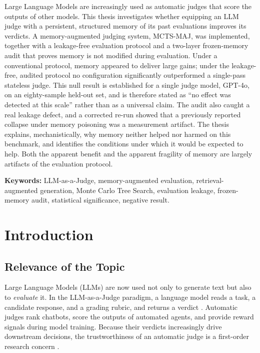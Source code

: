 \documentclass[14pt,a4paper]{extreport}
\begin{document}
Large Language Models are increasingly used as automatic judges that score the outputs of other models. This thesis investigates whether equipping an LLM judge with a persistent, structured memory of its past evaluations improves its verdicts. A memory-augmented judging system, MCTS-MAJ, was implemented, together with a leakage-free evaluation protocol and a two-layer frozen-memory audit that proves memory is not modified during evaluation. Under a conventional protocol, memory appeared to deliver large gains; under the leakage-free, audited protocol no configuration significantly outperformed a single-pass stateless judge. This null result is established for a single judge model, GPT-4o, on an eighty-sample held-out set, and is therefore stated as ``no effect was detected at this scale'' rather than as a universal claim. The audit also caught a real leakage defect, and a corrected re-run showed that a previously reported collapse under memory poisoning was a measurement artifact. The thesis explains, mechanistically, why memory neither helped nor harmed on this benchmark, and identifies the conditions under which it would be expected to help. Both the apparent benefit and the apparent fragility of memory are largely artifacts of the evaluation protocol.

\textbf{Keywords:} LLM-as-a-Judge, memory-augmented evaluation, retrieval-augmented generation, Monte Carlo Tree Search, evaluation leakage, frozen-memory audit, statistical significance, negative result.

\tableofcontents
\listoftables
{}
\listoffigures
{}

\chapter{Introduction}

\section{Relevance of the Topic}

Large Language Models (LLMs) are now used not only to generate text but also to \emph{evaluate} it. In the LLM-as-a-Judge paradigm, a language model reads a task, a candidate response, and a grading rubric, and returns a verdict \cite{mt_bench2023, geval2023, judge_survey2024}. Automatic judges rank chatbots, score the outputs of automated agents, and provide reward signals during model training. Because their verdicts increasingly drive downstream decisions, the trustworthiness of an automatic judge is a first-order research concern \cite{chateval2023, llm_judge_agreement2024}.
\end{document}
